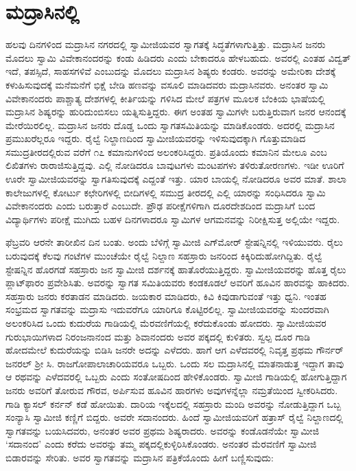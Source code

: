 
\chapter{ಮದ್ರಾಸಿನಲ್ಲಿ }

 ಹಲವು ದಿನಗಳಿಂದ ಮದ್ರಾಸಿನ ನಗರದಲ್ಲಿ ಸ್ವಾಮೀಜಿಯವರ ಸ್ವಾಗತಕ್ಕೆ ಸಿದ್ಧತೆಗಳಾಗುತ್ತಿತ್ತು. ಮದ್ರಾಸಿನ ಜನರು ಮೊದಲು ಸ್ವಾಮಿ ವಿವೇಕಾನಂದರನ್ನು ಕಂಡು ಹಿಡಿದರು ಎಂದು ಬೇಕಾದರೂ ಹೇಳಬಹುದು. ಅವರಲ್ಲಿ ಎಂತಹ ವಿದ್ವತ್ ಇದೆ, ತಪಸ್ಸಿದೆ, ಸಾಹಸಗಳಿವೆ ಎಂಬುದನ್ನು ಮೊದಲು ಮದ್ರಾಸಿನ ಶಿಷ್ಯರು ಕಂಡರು. ಅವರನ್ನು ಅಮೇರಿಕಾ ದೇಶಕ್ಕೆ ಕಳುಹಿಸುವುದಕ್ಕೆ ಮನೆಮನೆಗೆ ಭಿಕ್ಷೆ ಬೇಡಿ ಹಣವನ್ನು ವಸೂಲಿ ಮಾಡಿದವರು ಮದ್ರಾಸಿನವರು. ಅನಂತರ ಸ್ವಾಮಿ ವಿವೇಕಾನಂದರು ಪಾಶ್ಚಾತ್ಯ ದೇಶಗಳಲ್ಲಿ ಕೀರ್ತಿಯನ್ನು ಗಳಿಸಿದ ಮೇಲೆ ಪತ್ರಗಳ ಮೂಲಕ ಬೆಂಕಿಯ ಭಾಷೆಯಲ್ಲಿ ಮದ್ರಾಸಿನ ಶಿಷ್ಯರನ್ನು ಹುರಿದುಂಬಿಸಲು ಯತ್ನಿಸುತ್ತಿದ್ದರು. ಈಗ ಅಂತಹ ಸ್ವಾಮಿಗಳೇ ಬರುತ್ತಿರುವಾಗ ಜನರ ಆನಂದಕ್ಕೆ ಮೇರೆಯಿರಲಿಲ್ಲ. ಮದ್ರಾಸಿನ ಜನರು ದೊಡ್ಡ ಒಂದು ಸ್ವಾಗತಸಮಿತಿಯನ್ನು ಮಾಡಿಕೊಂಡರು. ಅದರಲ್ಲಿ ಮದ್ರಾಸಿನ ಪ್ರಮುಖರೆಲ್ಲರೂ ಇದ್ದರು. ರೈಲ್ವೆ ನಿಲ್ದಾಣದಿಂದ ಸ್ವಾಮೀಜಿಯವರನ್ನು ಇಳಿಸುವುದಕ್ಕಾಗಿ ಗೊತ್ತುಮಾಡಿದ ಸಮುದ್ರತೀರದಲ್ಲಿರುವ  ವರೆಗೆ ೧೭ ಕಮಾನುಗಳಿಂದ ಅಲಂಕರಿಸಿದ್ದರು. ಪ್ರತಿಯೊಂದು ಕಮಾನಿನ ಮೇಲೂ  ಎಂಬ ಲಿಖಿತಗಳು ರಾರಾಜಿಸುತ್ತಿದ್ದವು. ಎಲ್ಲಿ ನೋಡಿದರೂ ಬಾವುಟಗಳು ಮಂಟಪಗಳು ತಳಿರುತೋರಣಗಳು. ಇಡೀ ಊರಿಗೆ ಊರೇ ಸ್ವಾಮೀಜಿಯವರನ್ನು ಸ್ವಾಗತಿಸುವುದಕ್ಕೆ ಎದ್ದಂತೆ ಇತ್ತು. ಯಾರ ಬಾಯಲ್ಲಿ ನೋಡಿದರೂ ಅವರ ಮಾತೆ. ಶಾಲಾ ಕಾಲೇಜುಗಳಲ್ಲಿ ಕೋರ್ಟು ಕಛೇರಿಗಳಲ್ಲಿ ಬೀದಿಗಳಲ್ಲಿ ಸಮುದ್ರ ತೀರದಲ್ಲಿ ಎಲ್ಲಿ ಯಾರನ್ನು ಸಂಧಿಸಿದರೂ ಸ್ವಾಮಿ ವಿವೇಕಾನಂದರು ಎಂದು ಬರುತ್ತಾರೆ ಎಂಬುದೇ. ಪ್ರೌಢ ಪರೀಕ್ಷೆಗಳಿಗಾಗಿ ದೂರದೇಶದಿಂದ ಮದ್ರಾಸಿಗೆ ಬಂದ ವಿದ್ಯಾರ್ಥಿಗಳು ಪರೀಕ್ಷೆ ಮುಗಿದು ಬಹಳ ದಿನಗಳಾದರೂ ಸ್ವಾಮಿಗಳ ಆಗಮನವನ್ನು ನಿರೀಕ್ಷಿಸುತ್ತ ಅಲ್ಲಿಯೇ ಇದ್ದರು. 

 ಫೆಬ್ರವರಿ ಆರನೇ ತಾರೀಖಿನ ದಿನ ಬಂತು. ಅಂದು ಬೆಳಿಗ್ಗೆ ಸ್ವಾಮೀಜಿ ಎಗ್‍ಮೋರ್ ಸ್ಟೇಷನ್ನಿನಲ್ಲಿ ಇಳಿಯುವರು. ರೈಲು ಬರುವುದಕ್ಕೆ ಕೆಲವು ಗಂಟೆಗಳ ಮುಂಚೆಯೇ ರೈಲ್ವೆ ನಿಲ್ದಾಣ ಸಹಸ್ರಾರು ಜನರಿಂದ ಕಿಕ್ಕಿರಿದುಹೋಗಿದ್ದಿತು. ರೈಲ್ವೆ ಸ್ಟೇಷನ್ನಿನ ಹೊರಗಡೆ ಸಹಸ್ರಾರು ಜನ ಸ್ವಾಮೀಜಿ ದರ್ಶನಕ್ಕೆ ಹಾತೊರೆಯುತ್ತಿದ್ದರು. ಸ್ವಾಮೀಜಿಯವರನ್ನು ಹೊತ್ತ ರೈಲು ಪ್ಲಾಟ್‍ಫಾರಂ ಪ್ರವೇಶಿಸಿತು. ಅವರನ್ನು ಸ್ವಾಗತ ಸಮಿತಿಯವರು ಕಂಡಕೂಡಲೆ ಅವರಿಗೆ ಹೂವಿನ ಹಾರವನ್ನು ಹಾಕಿದರು. ಸಹಸ್ರಾರು ಜನರು ಕರತಾಡನ ಮಾಡಿದರು. ಜಯಕಾರ ಮಾಡಿದರು, ಕಿವಿ ಕಿವುಡಾಗುವಂತೆ ಇತ್ತು ಧ್ವನಿ. ಇಂತಹ ಸಂಭ್ರಮದ ಸ್ವಾಗತವನ್ನು ಮದ್ರಾಸು ಇದುವರೆಗೂ ಯಾರಿಗೂ ಕೊಟ್ಟಿರಲಿಲ್ಲ. ಸ್ವಾಮೀಜಿಯವರನ್ನು ಸುಂದರವಾಗಿ ಅಲಂಕರಿಸಿದ ಒಂದು ಕುದುರೆಯ ಗಾಡಿಯಲ್ಲಿ ಮೆರವಣಿಗೆಯಲ್ಲಿ ಕರೆದುಕೊಂಡು ಹೋದರು. ಸ್ವಾಮೀಜಿಯವರ ಗುರುಭಾಯಿಗಳಾದ ನಿರಂಜನಾನಂದ ಮತ್ತು ಶಿವಾನಂದರು ಅವರ ಪಕ್ಕದಲ್ಲಿ ಕುಳಿತರು. ಸ್ವಲ್ಪ ದೂರ ಗಾಡಿ ಹೋದಮೇಲೆ ಕುದುರೆಯನ್ನು ಬಿಡಿಸಿ ಜನರೇ ಅದನ್ನು ಎಳೆದರು. ಹಾಗೆ ಆಗ ಎಳೆದವರಲ್ಲಿ ನಿವೃತ್ತ ಪ್ರಥಮ ಗೌರ್ನರ್ ಜನರಲ್ ಶ‍್ರೀ ಸಿ. ರಾಜಗೋಪಾಲಾಚಾರಿಯವರೂ ಒಬ್ಬರು. ಒಂದು ಸಲ ಮದ್ರಾಸಿನಲ್ಲಿ ಮಾತನಾಡುತ್ತ ಇದ್ದಾಗ ತಾವು ಆ ರಥವನ್ನು ಎಳೆದವರಲ್ಲಿ ಒಬ್ಬರು ಎಂದು ಸಂತೋಷದಿಂದ ಹೇಳಿಕೊಂಡರು. ಸ್ವಾಮೀಜಿ ಗಾಡಿಯಲ್ಲಿ ಹೋಗುತ್ತಿದ್ದಾಗ ಜನರು ಅವರಿಗೆ ತೋರುವ ಗೌರವ, ಅರ್ಪಿಸುವ ಹೂವಿನ ಹಾರಗಳು ಅವುಗಳನ್ನೆಲ್ಲಾ ನಮ್ರತೆಯಿಂದ ಸ್ವೀಕರಿಸಿದರು. ಗಾಡಿ ಕ್ಯಾಸಲ್ ಕರ್ನನ್ ಕಡೆ ಹೋಯಿತು. ದಾರಿಯ ಇಕ್ಕೆಲದಲ್ಲಿ ಸಹಸ್ರಾರು ಮಂದಿ ಅವರನ್ನು ನೋಡುತ್ತಿದ್ದಾಗ ಒಬ್ಬ ಸಂನ್ಯಾಸಿ ಸ್ವಾಮೀಜಿ ಕಣ್ಣಿಗೆ ಬಿದ್ದರು. ಅವರೇ ಸದಾನಂದರು. ಹಿಂದೆ ಸ್ವಾಮೀಜಿಯವರಿಗೆ ಹತ್ರಾಸ್ ರೈಲ್ವೆ ನಿಲ್ದಾಣದಲ್ಲಿ ಸ್ವಾಗತವನ್ನು ಬಯಸಿದವರು, ಅನಂತರ ಅವರ ಪ್ರಥಮ ಶಿಷ್ಯರಾದರು. ಅವರನ್ನು ಕಂಡೊಡನೆಯೇ ಸ್ವಾಮೀಜಿ ‘ಸದಾನಂದ’ ಎಂದು ಕರೆದು ಅವರನ್ನು ತಮ್ಮ ಪಕ್ಕದಲ್ಲಿ\break ಕುಳ್ಳಿರಿಸಿಕೊಂಡರು. ಅನಂತರ ಮೆರವಣಿಗೆ ಸ್ವಾಮೀಜಿ ಬಿಡಾರವನ್ನು ಸೇರಿತು. ಅವರ ಸ್ವಾಗತವನ್ನು ಮದ್ರಾಸಿನ ಪತ್ರಿಕೆಯೊಂದು ಹೀಗೆ ಬಣ್ಣಿಸುವುದು: 

